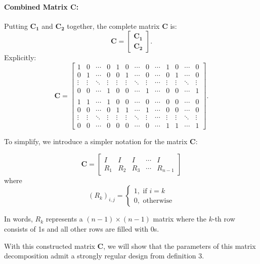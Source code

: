 \documentclass{article}
\begin{document}
\paragraph{Combined Matrix \( \mathbf{C} \):}

Putting \( \mathbf{C_1} \) and \( \mathbf{C_2} \) together, the complete matrix \( \mathbf{C} \) is:
\[
\mathbf{C} = 
\begin{bmatrix}
\mathbf{C_1} \\ 
\mathbf{C_2}
\end{bmatrix}.
\]
Explicitly:
\[
\mathbf{C} = 
\begin{bmatrix}
1 & 0 & \cdots & 0 & 1 & 0 & \cdots & 0 & \cdots & 1 & 0 & \cdots & 0 \\
0 & 1 & \cdots & 0 & 0 & 1 & \cdots & 0 & \cdots & 0 & 1 & \cdots & 0 \\
\vdots & \vdots & \ddots & \vdots & \vdots & \vdots & \ddots & \vdots & \cdots & \vdots & \vdots & \ddots & \vdots \\
0 & 0 & \cdots & 1 & 0 & 0 & \cdots & 1 & \cdots & 0 & 0 & \cdots & 1 \\ \\
1 & 1 & \cdots & 1 & 0 & 0 & \cdots & 0 & \cdots & 0 & 0 & \cdots & 0 \\
0 & 0 & \cdots & 0 & 1 & 1 & \cdots & 1 & \cdots & 0 & 0 & \cdots & 0 \\
\vdots & \vdots & \ddots & \vdots & \vdots & \vdots & \ddots & \vdots & \cdots & \vdots & \vdots & \ddots & \vdots \\
0 & 0 & \cdots & 0 & 0 & 0 & \cdots & 0 & \cdots & 1 & 1 & \cdots & 1
\end{bmatrix}.
\]

To simplify, we introduce a simpler notation for the matrix \(\mathbf{C}\):

\[
\mathbf{C} =
\begin{bmatrix}
    I & I & I & \cdots & I \\
    R_1 & R_2 & R_3 & \cdots & R_{n-1}
\end{bmatrix}
\]
where 
\[
(R_k)_{i,j} = 
\begin{cases}
    1, \text{ if }i=k \\
    0, \text{ otherwise}
\end{cases}
\]

In words, \(R_k\) represents a \((n-1)\times (n-1)\) matrix where the \(k\)-th row consists of 1s and all other rows are filled with 0s.

With this constructed matrix \(\mathbf{C}\), we will show that the parameters of this matrix decomposition admit a strongly regular design from definition 3.
\end{document}
